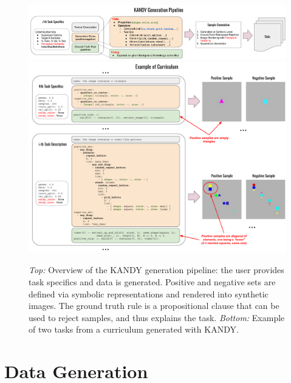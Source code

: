 

\begin{figure}
\centering
\includegraphics[width=1.0\textwidth]{imgs/kandy/Fig1a.pdf}
\vskip 4mm
\includegraphics[width=\textwidth]{imgs/kandy/Fig1b.pdf}
\caption[KANDY generation pipeline]{\textit{Top:} Overview of the KANDY generation pipeline: the user provides task specifics and data is generated. Positive and negative sets are defined via symbolic representations and rendered into synthetic images. The ground truth rule is a propositional clause that can be used to reject samples, and thus explains the task. \textit{Bottom:} Example of two tasks from a curriculum generated with KANDY. \label{kandy:fig:example-kandy}}
\end{figure}

\section{Data Generation}\label{kandy:sec:generation}
%

